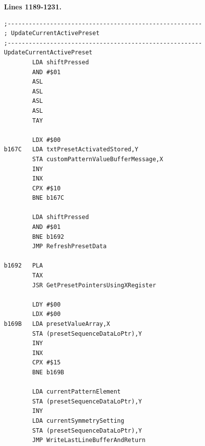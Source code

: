 \clearpage
\textbf{Lines 1189-1231. } 
\begin{lstlisting}
;-------------------------------------------------------
; UpdateCurrentActivePreset
;-------------------------------------------------------
UpdateCurrentActivePreset    
        LDA shiftPressed
        AND #$01
        ASL 
        ASL 
        ASL 
        ASL 
        TAY 

        LDX #$00
b167C   LDA txtPresetActivatedStored,Y
        STA customPatternValueBufferMessage,X
        INY 
        INX 
        CPX #$10
        BNE b167C

        LDA shiftPressed
        AND #$01
        BNE b1692
        JMP RefreshPresetData

b1692   PLA 
        TAX 
        JSR GetPresetPointersUsingXRegister

        LDY #$00
        LDX #$00
b169B   LDA presetValueArray,X
        STA (presetSequenceDataLoPtr),Y
        INY 
        INX 
        CPX #$15
        BNE b169B

        LDA currentPatternElement
        STA (presetSequenceDataLoPtr),Y
        INY 
        LDA currentSymmetrySetting
        STA (presetSequenceDataLoPtr),Y
        JMP WriteLastLineBufferAndReturn
\end{lstlisting}
\clearpage

